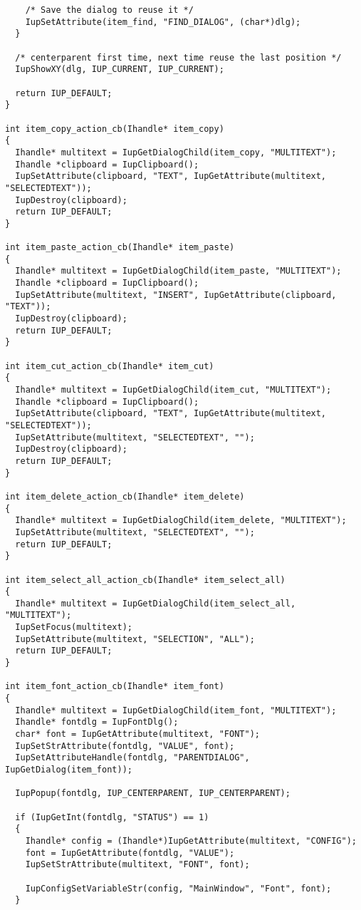 \documentclass{ctexart}
\begin{document}
\begin{lstlisting}
    /* Save the dialog to reuse it */
    IupSetAttribute(item_find, "FIND_DIALOG", (char*)dlg);
  }

  /* centerparent first time, next time reuse the last position */
  IupShowXY(dlg, IUP_CURRENT, IUP_CURRENT);

  return IUP_DEFAULT;
}

int item_copy_action_cb(Ihandle* item_copy) 
{
  Ihandle* multitext = IupGetDialogChild(item_copy, "MULTITEXT");
  Ihandle *clipboard = IupClipboard();
  IupSetAttribute(clipboard, "TEXT", IupGetAttribute(multitext, "SELECTEDTEXT"));
  IupDestroy(clipboard);
  return IUP_DEFAULT;
}

int item_paste_action_cb(Ihandle* item_paste) 
{
  Ihandle* multitext = IupGetDialogChild(item_paste, "MULTITEXT");
  Ihandle *clipboard = IupClipboard();
  IupSetAttribute(multitext, "INSERT", IupGetAttribute(clipboard, "TEXT"));
  IupDestroy(clipboard);
  return IUP_DEFAULT;
}

int item_cut_action_cb(Ihandle* item_cut) 
{
  Ihandle* multitext = IupGetDialogChild(item_cut, "MULTITEXT");
  Ihandle *clipboard = IupClipboard();
  IupSetAttribute(clipboard, "TEXT", IupGetAttribute(multitext, "SELECTEDTEXT"));
  IupSetAttribute(multitext, "SELECTEDTEXT", "");
  IupDestroy(clipboard);
  return IUP_DEFAULT;
}

int item_delete_action_cb(Ihandle* item_delete) 
{
  Ihandle* multitext = IupGetDialogChild(item_delete, "MULTITEXT");
  IupSetAttribute(multitext, "SELECTEDTEXT", "");
  return IUP_DEFAULT;
}

int item_select_all_action_cb(Ihandle* item_select_all) 
{
  Ihandle* multitext = IupGetDialogChild(item_select_all, "MULTITEXT");
  IupSetFocus(multitext);
  IupSetAttribute(multitext, "SELECTION", "ALL");
  return IUP_DEFAULT;
}

int item_font_action_cb(Ihandle* item_font)
{
  Ihandle* multitext = IupGetDialogChild(item_font, "MULTITEXT");
  Ihandle* fontdlg = IupFontDlg();
  char* font = IupGetAttribute(multitext, "FONT");
  IupSetStrAttribute(fontdlg, "VALUE", font);
  IupSetAttributeHandle(fontdlg, "PARENTDIALOG", IupGetDialog(item_font));

  IupPopup(fontdlg, IUP_CENTERPARENT, IUP_CENTERPARENT);

  if (IupGetInt(fontdlg, "STATUS") == 1)
  {
    Ihandle* config = (Ihandle*)IupGetAttribute(multitext, "CONFIG");
    font = IupGetAttribute(fontdlg, "VALUE");
    IupSetStrAttribute(multitext, "FONT", font);

    IupConfigSetVariableStr(config, "MainWindow", "Font", font);
  }


\end{lstlisting}
\end{document}
